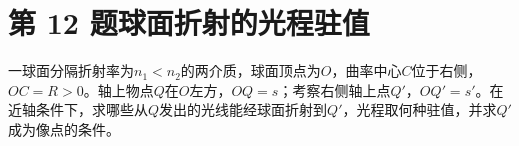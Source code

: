 \documentclass[UTF8,fontset=fandol,a4paper,11pt]{ctexart}
\begin{document}


\section*{第 12 题\quad 球面折射的光程驻值}\label{q:12}

一球面分隔折射率为$n_1<n_2$的两介质，球面顶点为$O$，曲率中心$C$位于右侧，$OC=R>0$。轴上物点$Q$在$O$左方，$OQ=s$；考察右侧轴上点$Q'$，$OQ'=s'$。在近轴条件下，求哪些从$Q$发出的光线能经球面折射到$Q'$，光程取何种驻值，并求$Q'$成为像点的条件。

\begin{center}\begin{minipage}{.98\linewidth}\centering
{}
\end{minipage}
\end{center}
\end{document}
